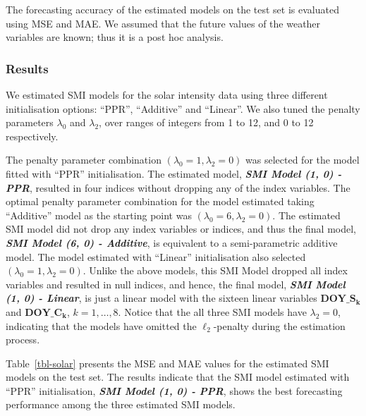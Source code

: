 \documentclass[
  11pt,
  a4paper,
]{report}
\begin{document}
The forecasting accuracy of the estimated models on the test set is
evaluated using MSE and MAE. We assumed that the future values of the
weather variables are known; thus it is a post hoc analysis.

\subsubsection{Results}\label{results-1}

We estimated SMI models for the solar intensity data using three
different initialisation options: ``PPR'', ``Additive'' and ``Linear''.
We also tuned the penalty parameters \(\lambda_{0}\) and
\(\lambda_{2}\), over ranges of integers from 1 to 12, and 0 to 12
respectively.

The penalty parameter combination \((\lambda_{0} = 1, \lambda_{2} = 0)\)
was selected for the model fitted with ``PPR'' initialisation. The
estimated model, \textbf{\emph{SMI Model (1, 0) - PPR}}, resulted in
four indices without dropping any of the index variables. The optimal
penalty parameter combination for the model estimated taking
``Additive'' model as the starting point was
\((\lambda_{0} = 6, \lambda_{2} = 0)\). The estimated SMI model did not
drop any index variables or indices, and thus the final model,
\textbf{\emph{SMI Model (6, 0) - Additive}}, is equivalent to a
semi-parametric additive model. The model estimated with ``Linear''
initialisation also selected \((\lambda_{0} = 1, \lambda_{2} = 0)\).
Unlike the above models, this SMI Model dropped all index variables and
resulted in null indices, and hence, the final model, \textbf{\emph{SMI
Model (1, 0) - Linear}}, is just a linear model with the sixteen linear
variables \(\textbf{DOY}\_\textbf{S}_{\bm{k}}\) and
\(\textbf{DOY}\_\textbf{C}_{\bm{k}}\), \(k = 1, \dots, 8\). Notice that
the all three SMI models have \(\lambda_{2} = 0\), indicating that the
models have omitted the \(\ell_{2}\)-penalty during the estimation
process.

Table~\ref{tbl-solar} presents the MSE and MAE values for the estimated
SMI models on the test set. The results indicate that the SMI model
estimated with ``PPR'' initialisation, \textbf{\emph{SMI Model (1, 0) -
PPR}}, shows the best forecasting performance among the three estimated
SMI models.
\end{document}
